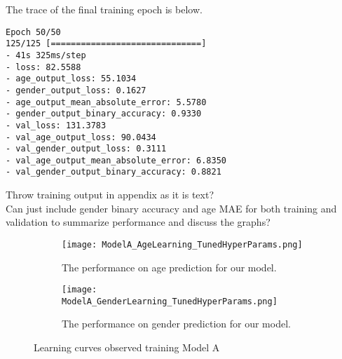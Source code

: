 The trace of the final training epoch is below.\\
\begin{verbatim}
Epoch 50/50
125/125 [==============================] 
- 41s 325ms/step 
- loss: 82.5588 
- age_output_loss: 55.1034 
- gender_output_loss: 0.1627 
- age_output_mean_absolute_error: 5.5780 
- gender_output_binary_accuracy: 0.9330 
- val_loss: 131.3783 
- val_age_output_loss: 90.0434 
- val_gender_output_loss: 0.3111 
- val_age_output_mean_absolute_error: 6.8350 
- val_gender_output_binary_accuracy: 0.8821
\end{verbatim}
\begin{notes}
    Throw training output in appendix as it is text?\\
    Can just include gender binary accuracy and age MAE for both training and validation to summarize performance and discuss the graphs?
\end{notes}
\begin{figure}[h]
    \begin{subfigure}{\textwidth}
        \centering
        \texttt{[image: ModelA\_AgeLearning\_TunedHyperParams.png]}
        \caption{\label{fig:ModelAPerformanceAge} The performance on age prediction for our model.}
    \end{subfigure}
    \begin{subfigure}{\textwidth}
        \centering
        \texttt{[image: ModelA\_GenderLearning\_TunedHyperParams.png]}
        \caption{\label{fig:ModelAPerformanceGender} The performance on gender prediction for our model.}
    \end{subfigure}
    \label{fig:ModelAPerformance}
    \caption{Learning curves observed training Model A}
\end{figure}
